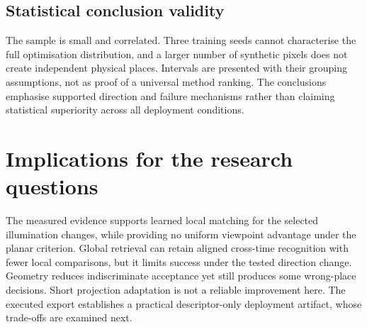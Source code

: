 \subsection{Statistical conclusion validity}
The sample is small and correlated. Three training seeds cannot characterise the full optimisation distribution, and a larger number of synthetic pixels does not create independent physical places. Intervals are presented with their grouping assumptions, not as proof of a universal method ranking. The conclusions emphasise supported direction and failure mechanisms rather than claiming statistical superiority across all deployment conditions.

\section{Implications for the research questions}
The measured evidence supports learned local matching for the selected illumination changes, while providing no uniform viewpoint advantage under the planar criterion. Global retrieval can retain aligned cross-time recognition with fewer local comparisons, but it limits success under the tested direction change. Geometry reduces indiscriminate acceptance yet still produces some wrong-place decisions. Short projection adaptation is not a reliable improvement here. The executed export establishes a practical descriptor-only deployment artifact, whose trade-offs are examined next.
